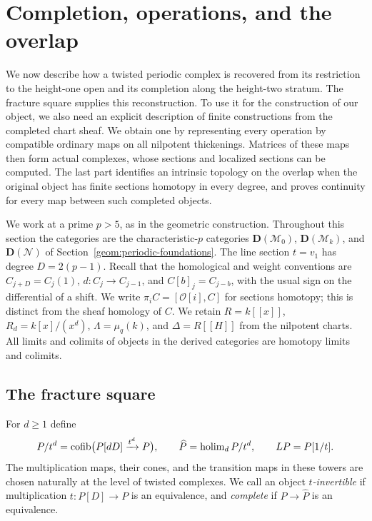 \section{Completion, operations, and the overlap}
\label{complete:section}

We now describe how a twisted periodic complex is recovered from its
restriction to the height-one open and its completion along the
height-two stratum. The fracture square supplies this reconstruction.
To use it for the construction of our object, we also need an explicit
description of finite constructions from the completed chart sheaf.
We obtain one by representing every operation by compatible ordinary
maps on all nilpotent thickenings. Matrices of these maps then form
actual complexes, whose sections and localized sections can be computed.
The last part identifies an intrinsic topology on the overlap when the
original object has finite sections homotopy in every degree, and proves
continuity for every map between such completed objects.

We work at a prime $p>5$, as in the geometric construction. Throughout
this section the categories are the characteristic-$p$ categories
$\mathbf D(\mathcal M_0)$, $\mathbf D(\mathcal M_k)$, and
$\mathbf D(\mathcal N)$ of Section~\ref{geom:periodic-foundations}.
The line section $t=v_1$ has degree $D=2(p-1)$. Recall that the
homological and weight conventions are
$C_{j+D}=C_j(1)$, $d:C_j\to C_{j-1}$, and $C[b]_j=C_{j-b}$,
with the usual sign on the differential of a shift. We write
$\pi_iC=[\mathcal O[i],C]$ for
sections homotopy; this is distinct from the sheaf homology of $C$.
We retain $R=k[[x]]$, $R_d=k[x]/(x^d)$, $\Lambda=\mu_q(k)$, and
$\Delta=R[[H]]$ from the nilpotent charts. All limits and colimits of
objects in the derived categories are homotopy limits and colimits.

\subsection{The fracture square}

For $d\geq 1$ define
\begin{equation}
\label{complete:definitions}
 P/t^d=\operatorname{cofib}\bigl(P[dD]\xrightarrow{t^d}P\bigr),
 \qquad
 \widehat P=\operatorname{holim}_d P/t^d,
 \qquad
 LP=P[1/t].
\end{equation}
The multiplication maps, their cones, and the transition maps in these
towers are chosen naturally at the level of twisted complexes. We call
an object \emph{$t$-invertible} if multiplication
$t:P[D]\to P$ is an equivalence, and \emph{complete} if
$P\to\widehat P$ is an equivalence.

